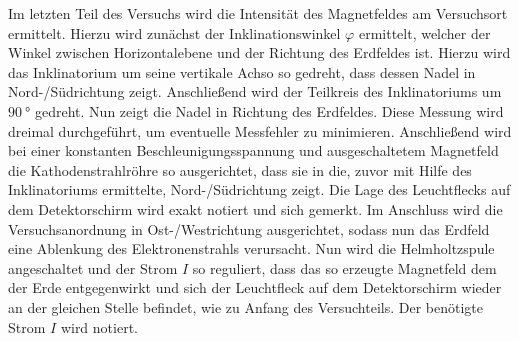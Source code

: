 \noindent Im letzten Teil des Versuchs wird die Intensität des Magnetfeldes am Versuchsort ermittelt.
Hierzu wird zunächst der Inklinationswinkel $\varphi$ ermittelt, welcher der Winkel zwischen Horizontalebene
und der Richtung des Erdfeldes ist. Hierzu wird das Inklinatorium um seine vertikale Achso so gedreht, dass
dessen Nadel in Nord-/Südrichtung zeigt. Anschließend wird der Teilkreis des Inklinatoriums um $\SI{90}{\degree}$
gedreht. Nun zeigt die Nadel in Richtung des Erdfeldes. Diese Messung wird dreimal durchgeführt, um eventuelle
Messfehler zu minimieren.
Anschließend wird bei einer konstanten Beschleunigungsspannung und ausgeschaltetem Magnetfeld
die Kathodenstrahlröhre so ausgerichtet, dass sie in die, zuvor mit Hilfe des Inklinatoriums ermittelte,
Nord-/Südrichtung zeigt. Die Lage des Leuchtflecks auf dem Detektorschirm wird exakt notiert und sich gemerkt.
Im Anschluss wird die Versuchsanordnung in Ost-/Westrichtung ausgerichtet, sodass nun das Erdfeld eine
Ablenkung des Elektronenstrahls verursacht. Nun wird die Helmholtzspule angeschaltet und
der Strom $I$ so reguliert, dass das so erzeugte Magnetfeld dem der Erde entgegenwirkt und sich
der Leuchtfleck auf dem Detektorschirm wieder an der gleichen Stelle befindet, wie zu Anfang des Versuchteils.
Der benötigte Strom $I$ wird notiert.
